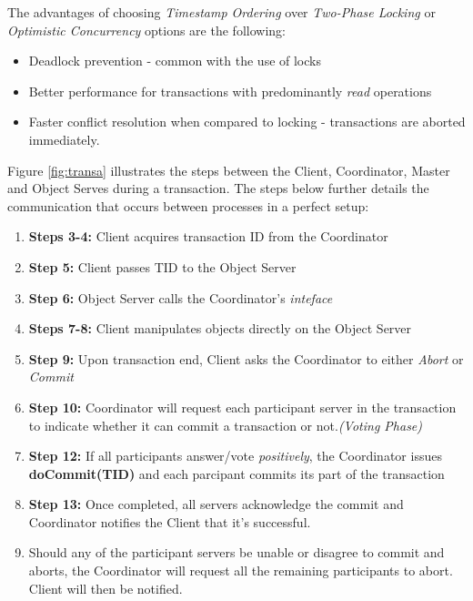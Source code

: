\documentclass[times, 10pt,twocolumn]{article}
\begin{document}
The advantages of choosing {\it Timestamp Ordering} over {\it Two-Phase Locking} or {\it Optimistic Concurrency} options are the following: 
\begin{itemize}[noitemsep, nolistsep]
\item Deadlock prevention - common with the use of locks
\item Better performance for transactions with predominantly {\it read} operations \cite{bernstein1987concurrency}
\item Faster conflict resolution when compared to locking - transactions are aborted immediately.
\end{itemize}

Figure \ref{fig:transa} illustrates the steps between the Client, Coordinator, Master and Object Serves during a transaction. The steps below further details the communication that occurs between processes in a perfect setup: 

\begin{enumerate}
\item {\bf Steps 3-4:} Client acquires transaction ID from the Coordinator 
\item {\bf Step 5:} Client passes TID to the Object Server
\item {\bf Step 6:} Object Server calls the Coordinator's {\it inteface}
\item {\bf Steps 7-8:} Client manipulates objects directly on the Object Server
\item {\bf Step 9:} Upon transaction end, Client asks the Coordinator to either {\it Abort} or {\it Commit} 
\item {\bf Step 10:} Coordinator will request each participant server in the transaction to indicate whether it can commit a transaction or not.{\it (Voting Phase)}
\item {\bf Step 12:} If all participants answer/vote {\it positively}, the Coordinator issues {\bf doCommit(TID)} and each parcipant commits its part of the transaction
\item {\bf Step 13:} Once completed, all servers acknowledge the commit and Coordinator notifies the Client that it's successful.
\item Should any of the participant servers be unable or disagree to commit and aborts, the Coordinator will request all the remaining participants to abort. Client will then be notified.
\end{enumerate}
\end{document}
